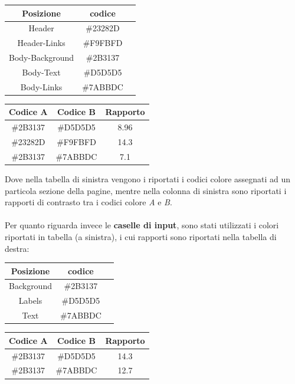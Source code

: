 \documentclass[12pt]{article}
\begin{document}
\begin{multicols}{2}
	\begin{center}
		\begin{tabular}{|c|c|c|}
			\hline
			\textbf{Posizione} & \textbf{codice}\\
			\hline
			Header & \#23282D \\
			\hline
			Header-Links & \#F9FBFD \\
			\hline
			Body-Background & \#2B3137 \\
			\hline
			Body-Text & \#D5D5D5 \\
			\hline
			Body-Links & \#7ABBDC \\
			\hline
		\end{tabular}
	\end{center}
	
	\begin{center}
		\begin{tabular}{|c|c|c|}
			\hline
			\textbf{Codice A} & \textbf{Codice B} & \textbf{Rapporto}\\
			\hline
			\#2B3137 & \#D5D5D5 & 8.96\\
			\hline
			\#23282D & \#F9FBFD & 14.3\\
			\hline
			\#2B3137 & \#7ABBDC & 7.1\\
			\hline
		\end{tabular}
\end{center}
\end{multicols}
Dove nella tabella di sinistra vengono i riportati i codici colore assegnati ad un particola sezione della pagine, mentre nella colonna di sinistra sono riportati i rapporti di contrasto tra i codici colore \emph{A} e \emph{B}.\\\\

Per quanto riguarda invece le \textbf{caselle di input}, sono stati utilizzati i colori riportati in tabella (a sinistra), i cui rapporti sono riportati nella tabella di destra:
\begin{multicols}{2}
\begin{center}
		\begin{tabular}{|c|c|c|}
			\hline
			\textbf{Posizione} & \textbf{codice}\\
			\hline
			Background & \#2B3137 \\
			\hline
			Labels & \#D5D5D5 \\
			\hline
			Text & \#7ABBDC \\
			\hline
		\end{tabular}
	\end{center}
	
\begin{center}
		\begin{tabular}{|c|c|c|}
			\hline
			\textbf{Codice A} & \textbf{Codice B} & \textbf{Rapporto}\\
			\hline
			\#2B3137 & \#D5D5D5 & 14.3\\
			\hline
			\#2B3137 & \#7ABBDC & 12.7 \\
			\hline
		\end{tabular}
\end{center}
\end{multicols}
\pagebreak
\end{document}
